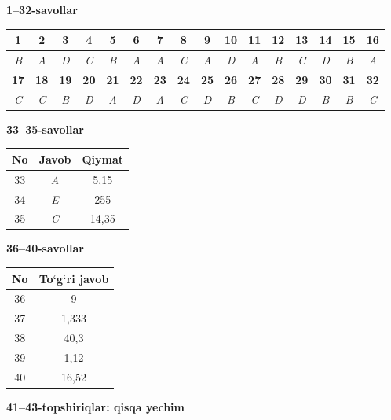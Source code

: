 \documentclass[11pt,a4paper]{article}
\begin{document}
\noindent\textbf{1--32-savollar}\par\smallskip
\noindent\begin{tabular}{|c|c|c|c|c|c|c|c|c|c|c|c|c|c|c|c|}\hline
\textbf{1} & \textbf{2} & \textbf{3} & \textbf{4} & \textbf{5} & \textbf{6} & \textbf{7} & \textbf{8} & \textbf{9} & \textbf{10} & \textbf{11} & \textbf{12} & \textbf{13} & \textbf{14} & \textbf{15} & \textbf{16}\\\hline
\textsl{B} & \textsl{A} & \textsl{D} & \textsl{C} & \textsl{B} & \textsl{A} & \textsl{A} & \textsl{C} & \textsl{A} & \textsl{D} & \textsl{A} & \textsl{B} & \textsl{C} & \textsl{D} & \textsl{B} & \textsl{A}\\\hline
\textbf{17} & \textbf{18} & \textbf{19} & \textbf{20} & \textbf{21} & \textbf{22} & \textbf{23} & \textbf{24} & \textbf{25} & \textbf{26} & \textbf{27} & \textbf{28} & \textbf{29} & \textbf{30} & \textbf{31} & \textbf{32}\\\hline
\textsl{C} & \textsl{C} & \textsl{B} & \textsl{D} & \textsl{A} & \textsl{D} & \textsl{A} & \textsl{C} & \textsl{D} & \textsl{B} & \textsl{C} & \textsl{D} & \textsl{D} & \textsl{B} & \textsl{B} & \textsl{C}\\\hline
\end{tabular}\par\medskip
\noindent\textbf{33--35-savollar}\par\smallskip
\noindent\begin{tabular}{|c|c|c|}\hline \textbf{No} & \textbf{Javob} & \textbf{Qiymat}\\\hline
33 & \textsl{A} & 5,15\\\hline
34 & \textsl{E} & 255\\\hline
35 & \textsl{C} & 14,35\\\hline
\end{tabular}\par\medskip
\noindent\textbf{36--40-savollar}\par\smallskip
\noindent\begin{tabular}{|c|c|}\hline \textbf{No} & \textbf{To`g`ri javob}\\\hline
36 & 9\\\hline
37 & 1,333\\\hline
38 & 40,3\\\hline
39 & 1,12\\\hline
40 & 16,52\\\hline
\end{tabular}\par\medskip
\noindent\textbf{41--43-topshiriqlar: qisqa yechim}\par\smallskip
\end{document}
